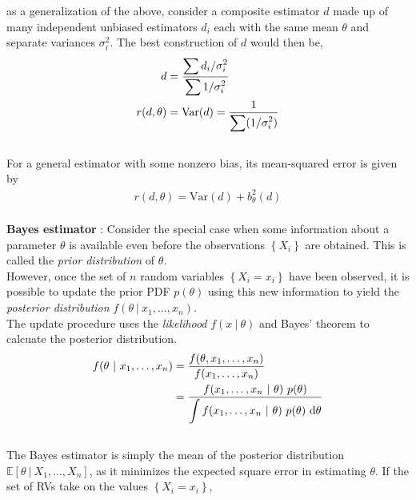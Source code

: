 as a generalization of the above, consider a composite estimator $ d $ made up of many independent unbiased estimators $ d_i $ each with the same mean $ \theta $ and separate variances $ \sigma^2_i $. The best construction of $ d $ would then be,\\

\begin{align}
	d &= \frac{\displaystyle \sum d_i / \sigma_i^2}{\displaystyle \sum 1/ \sigma_i^2} \\
	r(d, \theta) &= \mathrm{Var}(d) = \frac{\displaystyle 1}{\displaystyle \sum (1/ \sigma_i^2)}
\end{align}\\

For a general estimator with some nonzero bias, its mean-squared error is given by \\

\begin{align}
	r(d, \theta) = \mathrm{Var}(d) + b_\theta^2 (d)
\end{align}\\

\textbf{Bayes estimator} : Consider the special case when some information about a parameter $ \theta $ is available even before the observations $ \left\{X_i\right\} $ are obtained. This is called the \textit{prior distribution} of $ \theta $. \\

However, once the set of $ n $ random variables $ \left\{X_i = x_i\right\} $ have been observed, it is possible to update the prior PDF $ p(\theta) $ using this new information to yield the \textit{posterior distribution} $ f(\theta\ |\ x_1, \dots, x_n) $. \\

The update procedure uses the \textit{likelihood} $ f(x\ |\ \theta) $ and Bayes' theorem to calcuate the posterior distribution.\\

\begin{align}
	f(\theta\ |\ x_1, \dots, x_n) &= \frac{f(\theta, x_1, \dots, x_n)}{f(x_1, \dots, x_n)} \nonumber \\
	&= \frac{\displaystyle f(x_1, \dots, x_n\ |\ \theta)\ p(\theta)}{\displaystyle \int\limits f(x_1, \dots, x_n\ |\ \theta)\ p(\theta)\  \mathrm{d}\theta}
\end{align} \\

The Bayes estimator is simply the mean of the posterior distribution $ \mathbb{E}[\theta\ |\ X_1, \dots, X_n] $, as it minimizes the expected square error in estimating $ \theta $. If the set of RVs take on the values $ \left\{X_i = x_i\right\} $, \\

